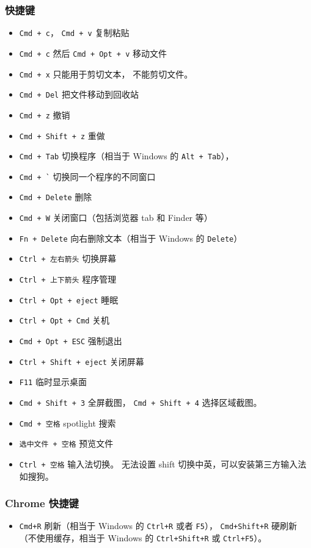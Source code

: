 \subsubsection{快捷键}
\begin{itemize}
\item \verb|Cmd + c|， \verb|Cmd + v| 复制粘贴
\item \verb|Cmd + c| 然后 \verb|Cmd + Opt + v| 移动文件
\item \verb|Cmd + x| 只能用于剪切文本， 不能剪切文件。
\item \verb|Cmd + Del| 把文件移动到回收站
\item \verb|Cmd + z| 撤销
\item \verb|Cmd + Shift + z| 重做
\item \verb|Cmd + Tab| 切换程序（相当于 Windows 的 \verb`Alt + Tab`），
\item \verb|Cmd + `| 切换同一个程序的不同窗口
\item \verb|Cmd + Delete| 删除
\item \verb`Cmd + W` 关闭窗口（包括浏览器 tab 和 Finder 等）
\item \verb|Fn + Delete| 向右删除文本（相当于 Windows 的 \verb|Delete|）
\item \verb|Ctrl + 左右箭头| 切换屏幕
\item \verb|Ctrl + 上下箭头| 程序管理
\item \verb|Ctrl + Opt + eject| 睡眠
\item \verb|Ctrl + Opt + Cmd| 关机
\item \verb|Cmd + Opt + ESC| 强制退出
\item \verb|Ctrl + Shift + eject| 关闭屏幕
\item \verb|F11| 临时显示桌面
\item \verb|Cmd + Shift + 3| 全屏截图， \verb|Cmd + Shift + 4| 选择区域截图。
\item \verb|Cmd + 空格| spotlight 搜索
\item \verb|选中文件 + 空格| 预览文件
\item \verb|Ctrl + 空格| 输入法切换。 无法设置 shift 切换中英，可以安装第三方输入法如搜狗。
\end{itemize}

\subsubsection{Chrome 快捷键}
\begin{itemize}
\item \verb|Cmd+R| 刷新（相当于 Windows 的 \verb|Ctrl+R| 或者 \verb|F5|）， \verb|Cmd+Shift+R| 硬刷新（不使用缓存，相当于 Windows 的 \verb|Ctrl+Shift+R| 或 \verb|Ctrl+F5|）。
\end{itemize}



